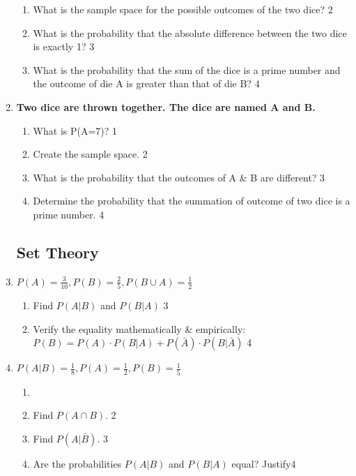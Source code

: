 \documentclass[a4paper,oneside, margin=1.4in]{book}
\begin{document}
\begin{enumerate}
  \begin{enumerate}  
    \item  
    	What is the sample space for the possible outcomes of the two dice? \hfill 2  
    \item  
    	What is the probability that the absolute difference between the two dice is exactly 1? \hfill 3  
    \item  
    	What is the probability that the sum of the dice is a prime number and the outcome of die A is greater than that of die B? \hfill 4  
  \end{enumerate}  


 \item
	  \textbf{Two dice are thrown together. The dice are named A and B.} 
  
  \begin{enumerate}
    \item
	What is P(A=7)? \hfill 1
    \item
	Create the sample space. \hfill 2
    \item  
	What is the probability that the outcomes of A \& B are different? \hfill 3
    \item
	Determine the probability that the summation of outcome of two dice is a prime number. \hfill 4
  \end{enumerate}


\subsection{Set Theory}

 \item
	  \textbf{$P(A) = \frac{3}{10}, P(B) = \frac 25, P(B\cup A) = \frac12$} 
  
  \begin{enumerate}
    \item  
	Find $P(A \vert B)$ and $P(B \vert A)$ \hfill 3
    \item
	Verify the equality mathematically \& empirically: $P(B) = P(A) \cdot P(B \vert A) + P(\bar A) \cdot P(B \vert \bar A)$ \hfill 4
  \end{enumerate}
  
   \item
  \textbf{$P(A\vert B) = \frac 1 8, P(A) = \frac 12, P(B) = \frac 15$}
 
  \begin{enumerate}
    \item
    \item
    	Find $P(A\cap B)$.  \hfill 2
    \item
    	Find $P(A\vert \bar B)$. \hfill 3
     \item
     	Are the probabilities $P(A\vert B)$ and $P(B\vert A)$ equal? Justify\hfill 4
  \end{enumerate}
  

\end{enumerate}
\end{document}
